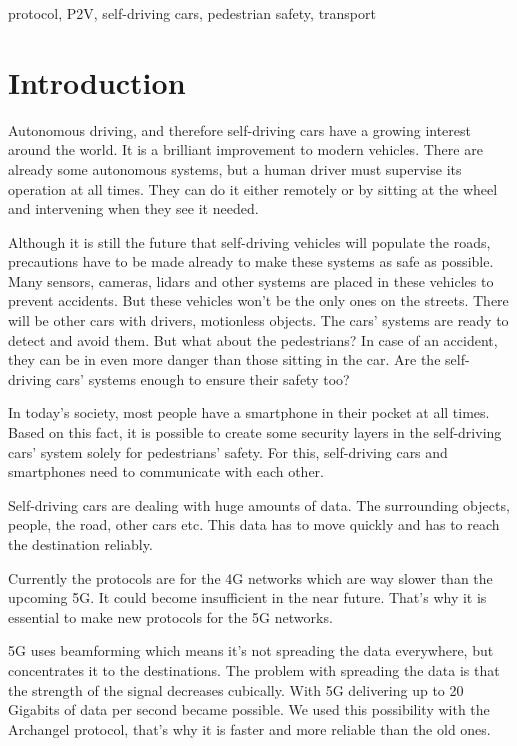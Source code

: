 \documentclass[conference]{IEEEtran}
\begin{document}
\begin{IEEEkeywords}
    protocol, P2V, self-driving cars, pedestrian safety, transport
\end{IEEEkeywords}

\section{Introduction}
Autonomous driving, and therefore self-driving cars have a growing interest around the world. It is a brilliant improvement to modern vehicles. There are already some autonomous systems, but a human driver must supervise its operation at all times. They can do it either remotely or by sitting at the wheel and intervening when they see it needed.

Although it is still the future that self-driving vehicles will populate the roads, precautions have to be made already to make these systems as safe as possible. Many sensors, cameras, lidars and other systems are placed in these vehicles to prevent accidents. But these vehicles won't be the only ones on the streets. There will be other cars with drivers, motionless objects. The cars' systems are ready to detect and avoid them. But what about the pedestrians? In case of an accident, they can be in even more danger than those sitting in the car. Are the self-driving cars' systems enough to ensure their safety too?

In today's society, most people have a smartphone in their pocket at all times. Based on this fact, it is possible to create some security layers in the self-driving cars' system solely for pedestrians' safety. For this, self-driving cars and smartphones need to communicate with each other. \cite{b1}

Self-driving cars are dealing with huge amounts of data. The surrounding objects, people, the road, other cars etc. This data has to move quickly and has to reach the destination reliably.

Currently the protocols are for the 4G networks which are way slower than the upcoming 5G. It could become insufficient in the near future. That's why it is essential to make new protocols for the 5G networks.

5G uses beamforming which means it's not spreading the data everywhere, but concentrates it to the destinations. The problem with spreading the data is that the strength of the signal decreases cubically. With 5G delivering up to 20 Gigabits of data per second became possible.
We used this possibility with the Archangel protocol, that's why it is faster and more reliable than the old ones.
\end{document}
